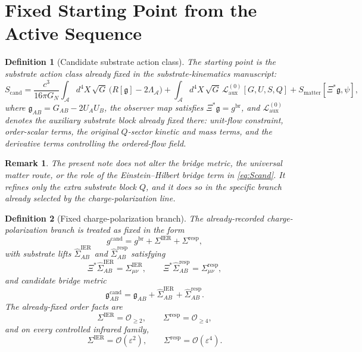 \documentclass[11pt]{article}
\newcommand{\Sub}{\mathcal A}
\newcommand{\ObserverMap}{\Xi}
\newcommand{\BridgeMetric}{\mathfrak g}
\newcommand{\ObserverMetric}{g^{\mathrm{br}}}
\newcommand{\CandidateMetric}{g^{\mathrm{cand}}}
\newcommand{\BaseShift}{\Sigma^{\mathrm{IER}}}
\newcommand{\ResponseShift}{\Sigma^{\mathrm{resp}}}
\newcommand{\BaseLift}{\widehat\Sigma^{\mathrm{IER}}}
\newcommand{\ResponseLift}{\widehat\Sigma^{\mathrm{resp}}}
\newcommand{\MatterAct}{S_{\mathrm{matter}}}
\newcommand{\epsIR}{\varepsilon}
\newtheorem{definition}{Definition}
\newtheorem{remark}{Remark}
\begin{document}
\section{Fixed Starting Point from the Active Sequence}

\begin{definition}[Candidate substrate action class]
\label{def:candidate}
The starting point is the substrate action class already fixed in the substrate-kinematics manuscript:
\begin{equation}
S_{\mathrm{cand}}
=
\frac{c^3}{16\pi G_N}
\int_{\Sub} d^4X\,\sqrt{G}\,\bigl(R[\BridgeMetric]-2\Lambda_{\Sub}\bigr)
+
\int_{\Sub} d^4X\,\sqrt{G}\,\mathcal L_{\mathrm{aux}}^{(0)}[G,U,S,Q]
+
\MatterAct[\ObserverMap^*\BridgeMetric,\psi],
\label{eq:Scand}
\end{equation}
where \(\BridgeMetric_{AB}=G_{AB}-2U_AU_B\), the observer map satisfies \(\ObserverMap^*\BridgeMetric=\ObserverMetric\), and \(\mathcal L_{\mathrm{aux}}^{(0)}\) denotes the auxiliary substrate block already fixed there: unit-flow constraint, order-scalar terms, the original \(Q\)-sector kinetic and mass terms, and the derivative terms controlling the ordered-flow field.
\end{definition}

\begin{remark}
The present note does not alter the bridge metric, the universal matter route, or the role of the Einstein--Hilbert bridge term in \eqref{eq:Scand}. It refines only the extra substrate block \(Q\), and it does so in the specific branch already selected by the charge-polarization line.
\end{remark}

\begin{definition}[Fixed charge-polarization branch]
\label{def:fixed}
The already-recorded charge-polarization branch is treated as fixed in the form
\begin{equation}
\CandidateMetric
=
\ObserverMetric+\BaseShift+\ResponseShift,
\label{eq:gcand}
\end{equation}
with substrate lifts \(\BaseLift_{AB}\) and \(\ResponseLift_{AB}\) satisfying
\begin{equation}
\ObserverMap^*\BaseLift_{AB}=\BaseShift_{\mu\nu},
\qquad
\ObserverMap^*\ResponseLift_{AB}=\ResponseShift_{\mu\nu},
\label{eq:lifts}
\end{equation}
and candidate bridge metric
\begin{equation}
\BridgeMetric_{AB}^{\mathrm{cand}}
=
\BridgeMetric_{AB}+\BaseLift_{AB}+\ResponseLift_{AB}.
\label{eq:bridgecand}
\end{equation}
The already-fixed order facts are
\begin{equation}
\BaseShift=\mathcal O_{\ge 2},
\qquad
\ResponseShift=\mathcal O_{\ge 4},
\label{eq:orders}
\end{equation}
and on every controlled infrared family,
\begin{equation}
\BaseShift=\mathcal O(\epsIR^2),
\qquad
\ResponseShift=\mathcal O(\epsIR^4).
\label{eq:irorders}
\end{equation}
\end{definition}
\end{document}
